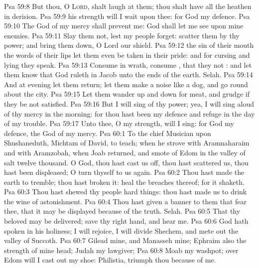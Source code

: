 \vs Psa 59:8 But thou, O \textsc{Lord}, shalt laugh at them; thou shalt have all the heathen in derision.
\vs Psa 59:9  his strength will I wait upon thee: for God  my defence.
\vs Psa 59:10 The God of my mercy shall prevent me: God shall let me see  upon mine enemies.
\vs Psa 59:11 Slay them not, lest my people forget: scatter them by thy power; and bring them down, O Lord our shield.
\vs Psa 59:12  the sin of their mouth  the words of their lips let them even be taken in their pride: and for cursing and lying  they speak.
\vs Psa 59:13 Consume  in wrath, consume , that they  not : and let them know that God ruleth in Jacob unto the ends of the earth. Selah.
\vs Psa 59:14 And at evening let them return;  let them make a noise like a dog, and go round about the city.
\vs Psa 59:15 Let them wander up and down for meat, and grudge if they be not satisfied.
\vs Psa 59:16 But I will sing of thy power; yea, I will sing aloud of thy mercy in the morning: for thou hast been my defence and refuge in the day of my trouble.
\vs Psa 59:17 Unto thee, O my strength, will I sing: for God  my defence,  the God of my mercy.
\vs Psa 60:1 To the chief Musician upon Shushaneduth, Michtam of David, to teach; when he strove with Aramnaharaim and with Aramzobah, when Joab returned, and smote of Edom in the valley of salt twelve thousand. O God, thou hast cast us off, thou hast scattered us, thou hast been displeased; O turn thyself to us again.
\vs Psa 60:2 Thou hast made the earth to tremble; thou hast broken it: heal the breaches thereof; for it shaketh.
\vs Psa 60:3 Thou hast shewed thy people hard things: thou hast made us to drink the wine of astonishment.
\vs Psa 60:4 Thou hast given a banner to them that fear thee, that it may be displayed because of the truth. Selah.
\vs Psa 60:5 That thy beloved may be delivered; save  thy right hand, and hear me.
\vs Psa 60:6 God hath spoken in his holiness; I will rejoice, I will divide Shechem, and mete out the valley of Succoth.
\vs Psa 60:7 Gilead  mine, and Manasseh  mine; Ephraim also  the strength of mine head; Judah  my lawgiver;
\vs Psa 60:8 Moab  my washpot; over Edom will I cast out my shoe: Philistia, triumph thou because of me.
